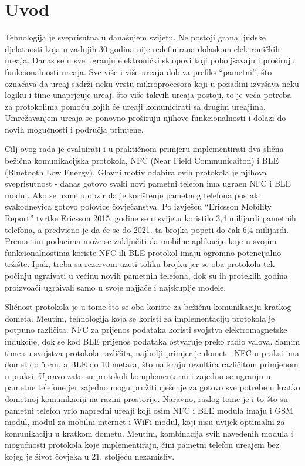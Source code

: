 \chapter{Uvod}

Tehnologija je sveprisutna u dana\v{s}njem svijetu. Ne postoji grana ljudske djelatnosti koja u zadnjih 30 godina nije redefinirana dolaskom elektroni\v{c}kih ure\dj aja. Danas se u sve ugra\dj uju elektroni\v{c}ki sklopovi koji pobolj\v{s}avaju i pro\v{s}iruju funkcionalnosti ure\dj aja. Sve vi\v{s}e i vi\v{s}e ure\dj aja dobiva prefiks ``pametni'', \v{s}to ozna\v{c}ava da ure\dj aj sadr\v{z}i neku vrstu mikroprocesora koji u pozadini izvr\v{s}ava neku logiku i time unaprje\dj uje ure\dj aj. \v{s}to vi\v{s}e takvih ure\dj aja postoji, to je ve\'{c}a potreba za protokolima pomo\'{c}u kojih \'{c}e ure\dj aji komunicirati sa drugim ure\dj ajima. Umre\v{z}avanjem ure\dj aja se ponovno pro\v{s}iruju njihove funkcionalnosti i dolazi do novih mogu\'{c}nosti i podru\v{c}ja primjene.

Cilj ovog rada je evaluirati i u prakti\v{c}nom primjeru implementirati dva sli\v{c}na be\v{z}i\v{c}na komunikacijska protokola, NFC (Near Field Communicaiton) i BLE (Bluetooth Low Energy). Glavni motiv odabira ovih protokola je njihova sveprisutnost -  danas gotovo svaki novi pametni telefon ima ugra\dj en NFC i BLE modul. Ako se uzme u obzir da je kori\v{s}tenje pametnog telefona postala svakodnevica gotovo polovice \v{c}ovje\v{c}anstva. Po izvje\v{s}\'{c}u ``Ericsson Mobility Report'' tvrtke Ericsson \cite{mobilityReport} 2015. godine se u svijetu koristilo 3,4 milijardi pametnih telefona, a predvi\dj eno je da \'{c}e se do 2021. ta brojka popeti do \v{c}ak 6,4 milijardi. Prema tim podacima mo\v{z}e se zaklju\v{c}iti da mobilne aplikacije koje u svojim funkcionalnostima koriste NFC ili BLE protokol imaju ogromno potencijalno tr\v{z}i\v{s}te. Ipak, treba sa rezervom uzeti toliku brojku jer se oba protokola tek po\v{c}inju ugra\dj ivati u ve\'{c}inu novih pametnih telefona, dok su ih proteklih godina proizvo\dj a\v{c}i ugra\dj ivali samo u svoje najja\v{c}e i najskuplje modele.

Sli\v{c}nost protokola je u tome \v{s}to se oba koriste za be\v{z}i\v{c}nu komunikaciju kratkog dometa. Me\dj utim, tehnologija koja se koristi za implementaciju protokola je potpuno razli\v{c}ita. NFC za prijenos podataka koristi svojstva elektromagnetske indukcije, dok se kod BLE prijenos podataka ostvaruje preko radio valova. Samim time su svojstva protokola razli\v{c}ita, najbolji primjer je domet - NFC u praksi ima domet do 5 cm, a BLE do 10 metara, \v{s}to na kraju rezultira razli\v{c}itom primjenom u praksi. Upravo zato su protokoli komplementarni i zajedno se ugra\dj uju u pametne telefone jer zajedno mogu pru\v{z}iti rje\v{s}enje za gotovo sve potrebe u kratko dometnoj komunikaciji na razini prostorije. Naravno, razlog tome je i to \v{s}to su pametni telefon vrlo napredni ure\dj aji koji osim NFC i BLE modula imaju i GSM modul, modul za mobilni internet i WiFi modul, koji nisu uvijek optimalni za komunikaciju u kratkom dometu. Me\dj utim, kombinacija svih navedenih modula i mogu\'{c}nosti protokola koje implementiraju, \v{c}ini pametni telefon ure\dj ajem bez kojeg je \v{z}ivot \v{c}ovjeka u 21. stolje\'{c}u nezamisliv.

